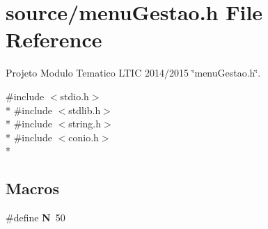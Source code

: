 \section{source/menu\+Gestao.h File Reference}
\label{menu_gestao_8h}


Projeto Modulo Tematico L\+T\+I\+C 2014/2015 \char`\"{}menu\+Gestao.\+h\char`\"{}.  


{\ttfamily \#include $<$stdio.\+h$>$}\\*
{\ttfamily \#include $<$stdlib.\+h$>$}\\*
{\ttfamily \#include $<$string.\+h$>$}\\*
{\ttfamily \#include $<$conio.\+h$>$}\\*
\subsection*{Macros}
\begin{DoxyCompactItemize}
\item 
\#define {\bfseries N}~50\label{menu_gestao_8h_a0240ac851181b84ac374872dc5434ee4}

\end{DoxyCompactItemize}
